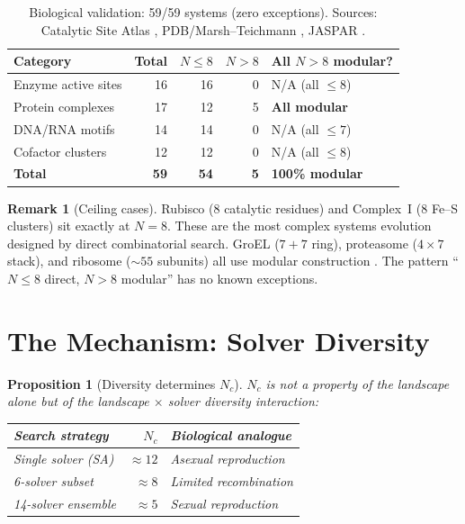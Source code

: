 \documentclass[11pt]{amsart}
\newtheorem{proposition}[theorem]{Proposition}
\theoremstyle{definition}
\newtheorem{remark}[theorem]{Remark}
\begin{document}
\begin{table}[ht]
\centering
\caption{Biological validation: 59/59 systems (zero exceptions). Sources: Catalytic Site Atlas \cite{porter2004}, PDB/Marsh--Teichmann \cite{marsh2015}, JASPAR \cite{fornes2020}.}
\label{tab:biology}
\begin{tabular}{l r r r l}
\toprule
Category & Total & $N \leq 8$ & $N > 8$ & All $N > 8$ modular? \\
\midrule
Enzyme active sites & 16 & 16 & 0 & N/A (all $\leq 8$) \\
Protein complexes & 17 & 12 & 5 & \textbf{All modular} \\
DNA/RNA motifs & 14 & 14 & 0 & N/A (all $\leq 7$) \\
Cofactor clusters & 12 & 12 & 0 & N/A (all $\leq 8$) \\
\midrule
\textbf{Total} & \textbf{59} & \textbf{54} & \textbf{5} & \textbf{100\% modular} \\
\bottomrule
\end{tabular}
\end{table}

\begin{remark}[Ceiling cases]
Rubisco (8 catalytic residues) and Complex~I (8 Fe--S clusters) sit exactly at $N = 8$. These are the most complex systems evolution designed by direct combinatorial search. GroEL ($7+7$ ring), proteasome ($4 \times 7$ stack), and ribosome ($\sim 55$ subunits) all use modular construction \cite{marsh2015}. The pattern ``$N \leq 8$ direct, $N > 8$ modular'' has no known exceptions.
\end{remark}


\section{The Mechanism: Solver Diversity}
\label{sec:diversity}

\begin{proposition}[Diversity determines $N_c$]\label{prop:diversity}
$N_c$ is not a property of the landscape alone but of the \emph{landscape $\times$ solver diversity interaction}:
\begin{center}
\begin{tabular}{l r l}
\toprule
Search strategy & $N_c$ & Biological analogue \\
\midrule
Single solver (SA) & $\approx 12$ & Asexual reproduction \\
6-solver subset & $\approx 8$ & Limited recombination \\
14-solver ensemble & $\approx 5$ & Sexual reproduction \\
\bottomrule
\end{tabular}
\end{center}
\end{proposition}
\end{document}
